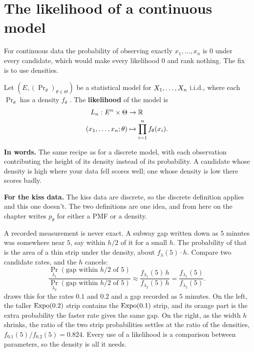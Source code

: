 \section{The likelihood of a continuous model}
\label{sec:lik-continuous}

For continuous data the probability of observing exactly $x_1, \ldots, x_n$ is $0$ under every candidate, which would make every likelihood $0$ and rank nothing.
The fix is to use densities.

\begin{definition}
\label{def:likelihood-continuous}
Let $(E, (\Pr_\theta)_{\theta \in \Theta})$ be a statistical model for $X_1, \ldots, X_n$ i.i.d., where each $\Pr_\theta$ has a density $f_\theta$ .
The \textbf{likelihood} of the model is
\begin{align*}
L_n : E^n \times \Theta &\to \mathbb{R} \\
(x_1, \ldots, x_n; \theta) &\mapsto \prod_{i=1}^n f_\theta(x_i).
\end{align*}
\end{definition}

\begin{inwords}
\textbf{In words.} The same recipe as for a discrete model, with each observation contributing the height of its density instead of its probability. A candidate whose density is high where your data fell scores well; one whose density is low there scores badly.
\par\smallskip
\textbf{For the kiss data.} The kiss data are discrete, so the discrete definition applies and this one doesn't. The two definitions are one idea, and from here on the chapter writes $p_\theta$ for either a PMF or a density.
\end{inwords}

\begin{intuition}
A recorded measurement is never exact.
A subway gap written down as $5$ minutes was somewhere near $5$, say within $h/2$ of it for a small $h$.
The probability of that is the area of a thin strip under the density, about $f_\lambda(5)\cdot h$.
Compare two candidate rates, and the $h$ cancels:
\[
\frac{\Pr_{\lambda_1}(\text{gap within } h/2 \text{ of } 5)}{\Pr_{\lambda_2}(\text{gap within } h/2 \text{ of } 5)} \approx \frac{f_{\lambda_1}(5)\, h}{f_{\lambda_2}(5)\, h} = \frac{f_{\lambda_1}(5)}{f_{\lambda_2}(5)}.
\]
 draws this for the rates $0.1$ and $0.2$ and a gap recorded as $5$ minutes.
On the left, the taller $\text{Expo}(0.2)$ strip contains the $\text{Expo}(0.1)$ strip, and its orange part is the extra probability the faster rate gives the same gap.
On the right, as the width $h$ shrinks, the ratio of the two strip probabilities settles at the ratio of the densities, $f_{0.1}(5)/f_{0.2}(5) = 0.824$.
Every use of a likelihood is a comparison between parameters, so the density is all it needs.
\end{intuition}

